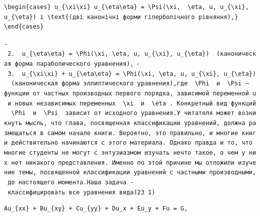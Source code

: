 \documentclass[
  ukrainian,
]{article}
\begin{document}
\begin{verbatim}
\begin{cases} u_{\xi\xi} u_{\eta\eta} = \Psi(\xi,  \eta, u, u_{\xi}, u_{\eta}) і \text{(дві канонічні форми гіперболічного рівняння),} \end{cases}
\end{verbatim}

\texttt{-\ 2.\ \ \textquotesingle{}u\_\{\textbackslash{}eta\textbackslash{}eta\}\ =\ \textbackslash{}Phi(\textbackslash{}xi,\ \textbackslash{}eta,\ u,\ u\_\{\textbackslash{}xi\},\ u\_\{\textbackslash{}eta\})\textquotesingle{}\ \ (каноническая\ форма\ параболического\ уравнения),}
\texttt{-\ 3.\ \ \textquotesingle{}u\_\{\textbackslash{}xi\textbackslash{}xi\}\ +\ u\_\{\textbackslash{}eta\textbackslash{}eta\}\ =\ \textbackslash{}Phi(\textbackslash{}xi,\ \textbackslash{}eta,\ u,\ u\_\{\textbackslash{}xi\},\ u\_\{\textbackslash{}eta\})\textquotesingle{}\ \ (каноническая\ форма\ эллиптического\ уравнения),где\ \ \textquotesingle{}\textbackslash{}Phi\textquotesingle{}\ \ и\ \ \textquotesingle{}\textbackslash{}Psi\textquotesingle{}\ —функции\ от\ частных\ производных\ первого\ порядка,\ зависимой\ переменной\ u\ и\ новых\ независимых\ переменных\ \ \textquotesingle{}\textbackslash{}xi\textquotesingle{}\ \ и\ \ \textquotesingle{}\textbackslash{}eta\textquotesingle{}\ .\ Конкретный\ вид\ функций\ \ \textquotesingle{}\textbackslash{}Phi\textquotesingle{}\ \ и\ \ \textquotesingle{}\textbackslash{}Psi\textquotesingle{}\ \ зависит\ от\ исходного\ уравнения.У\ читателя\ может\ возникнуть\ мысль,\ что\ глава,\ посвященная\ классификации\ уравнений,\ должна\ размещаться\ в\ самом\ начале\ книги.\ Вероятно,\ это\ правильно,\ и\ многие\ книги\ действительно\ начинаются\ с\ этого\ материала.\ Однако\ правда\ и\ то,\ что\ многие\ студенты\ не\ могут\ с\ энтузиазмом\ изучать\ нечто\ такое,\ о\ чем\ у\ них\ нет\ никакого\ представления.\ Именно\ по\ этой\ причине\ мы\ отложили\ изучение\ темы,\ посвященной\ классификации\ уравнений\ с\ частными\ производными,\ до\ настоящего\ момента.Наша\ задача\ -\ классифицировать\ все\ уравнения\ вида(23\ 1)}

\begin{verbatim}
Au_{xx} + Bu_{xy} + Cu_{yy} + Du_x + Eu_y + Fu = G,
\end{verbatim}
\end{document}

